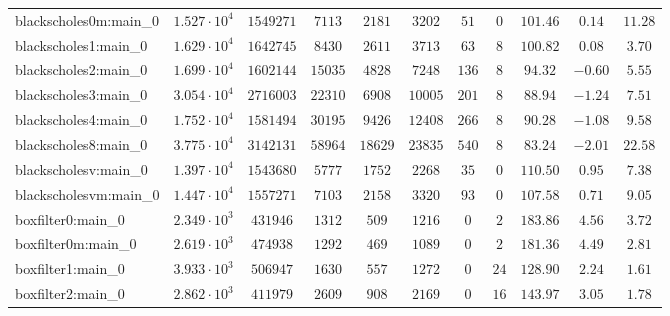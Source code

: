 \begin{tabular}{|l|c|c|c|c|c|c|c|c|c|c|}
blackscholes0m:main\_0         & $ 1.527 \cdot 10^{4} $ & $ 1549271  $ & $ 7113   $ & $ 2181   $ & $ 3202   $ & $ 51   $ & $ 0    $ & $ 101.46      $ & $ 0.14    $ & $ 11.28   $ \\
blackscholes1:main\_0          & $ 1.629 \cdot 10^{4} $ & $ 1642745  $ & $ 8430   $ & $ 2611   $ & $ 3713   $ & $ 63   $ & $ 8    $ & $ 100.82      $ & $ 0.08    $ & $ 3.70    $ \\
blackscholes2:main\_0          & $ 1.699 \cdot 10^{4} $ & $ 1602144  $ & $ 15035  $ & $ 4828   $ & $ 7248   $ & $ 136  $ & $ 8    $ & $ 94.32       $ & $ -0.60   $ & $ 5.55    $ \\
blackscholes3:main\_0          & $ 3.054 \cdot 10^{4} $ & $ 2716003  $ & $ 22310  $ & $ 6908   $ & $ 10005  $ & $ 201  $ & $ 8    $ & $ 88.94       $ & $ -1.24   $ & $ 7.51    $ \\
blackscholes4:main\_0          & $ 1.752 \cdot 10^{4} $ & $ 1581494  $ & $ 30195  $ & $ 9426   $ & $ 12408  $ & $ 266  $ & $ 8    $ & $ 90.28       $ & $ -1.08   $ & $ 9.58    $ \\
blackscholes8:main\_0          & $ 3.775 \cdot 10^{4} $ & $ 3142131  $ & $ 58964  $ & $ 18629  $ & $ 23835  $ & $ 540  $ & $ 8    $ & $ 83.24       $ & $ -2.01   $ & $ 22.58   $ \\
blackscholesv:main\_0          & $ 1.397 \cdot 10^{4} $ & $ 1543680  $ & $ 5777   $ & $ 1752   $ & $ 2268   $ & $ 35   $ & $ 0    $ & $ 110.50      $ & $ 0.95    $ & $ 7.38    $ \\
blackscholesvm:main\_0         & $ 1.447 \cdot 10^{4} $ & $ 1557271  $ & $ 7103   $ & $ 2158   $ & $ 3320   $ & $ 93   $ & $ 0    $ & $ 107.58      $ & $ 0.71    $ & $ 9.05    $ \\
boxfilter0:main\_0             & $ 2.349 \cdot 10^{3} $ & $ 431946   $ & $ 1312   $ & $ 509    $ & $ 1216   $ & $ 0    $ & $ 2    $ & $ 183.86      $ & $ 4.56    $ & $ 3.72    $ \\
boxfilter0m:main\_0            & $ 2.619 \cdot 10^{3} $ & $ 474938   $ & $ 1292   $ & $ 469    $ & $ 1089   $ & $ 0    $ & $ 2    $ & $ 181.36      $ & $ 4.49    $ & $ 2.81    $ \\
boxfilter1:main\_0             & $ 3.933 \cdot 10^{3} $ & $ 506947   $ & $ 1630   $ & $ 557    $ & $ 1272   $ & $ 0    $ & $ 24   $ & $ 128.90      $ & $ 2.24    $ & $ 1.61    $ \\
boxfilter2:main\_0             & $ 2.862 \cdot 10^{3} $ & $ 411979   $ & $ 2609   $ & $ 908    $ & $ 2169   $ & $ 0    $ & $ 16   $ & $ 143.97      $ & $ 3.05    $ & $ 1.78    $ \\

\end{tabular}
